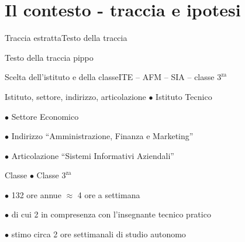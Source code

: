 \documentclass[italian]{beamer}
\begin{document}
\section[Contesto]{Il contesto - traccia e ipotesi}

\begin{frame}{Traccia estratta}{Testo della traccia}

	\begin{block}{Testo della traccia}
	pippo
	\end{block}

\end{frame}

\begin{frame}[allowframebreaks]{Scelta dell'istituto e della classe}{ITE -- AFM -- SIA -- classe $3^{\text{za}}$}
	
	\begin{block}{Istituto, settore, indirizzo, articolazione}
		\noindent$\bullet$ Istituto Tecnico
		
		\noindent\hspace*{0.5cm}$\bullet$ Settore Economico
		
		\noindent\hspace*{1.0cm}$\bullet$ Indirizzo ``Amministrazione, Finanza e Marketing''
		
		\noindent\hspace*{1.5cm}$\bullet$ Articolazione ``Sistemi Informativi Aziendali''
		
	\end{block}
	
	
	\begin{block}{Classe}
		\noindent\hspace*{2cm}$\bullet$ Classe $3^{\text{za}}$
		
		\noindent\hspace*{2.5cm}$\bullet$ 132 ore annue $\approx$ 4 ore a settimana
		
		\noindent\hspace*{2.5cm}$\bullet$ di cui 2 in compresenza con l'insegnante tecnico pratico

		\noindent\hspace*{2.5cm}$\bullet$ stimo circa 2 ore settimanali di studio autonomo
	\end{block}
	
\end{frame}
\end{document}
